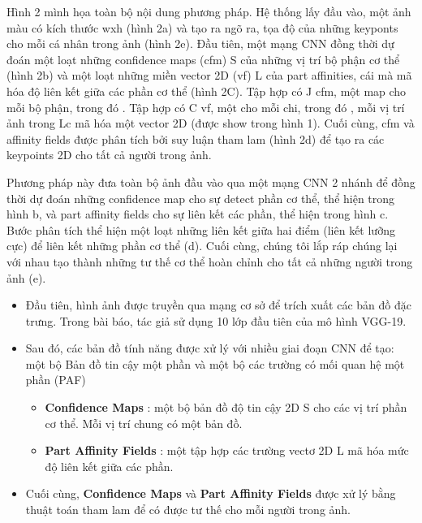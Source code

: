 Hình 2 mình họa toàn bộ nội dung phương pháp. Hệ thống lấy đầu vào, một ảnh màu có kích thước wxh (hình 2a) và tạo ra ngõ ra, tọa độ của những keyponts cho mỗi cá nhân trong ảnh (hình 2e). Đầu tiên, một mạng CNN đồng thời dự đoán một loạt những confidence maps (cfm) S của những vị trí bộ phận cơ thể (hình 2b) và một loạt những miền vector 2D (vf) L của part affinities, cái mà mã hóa độ liên kết giữa các phần cơ thể (hình 2C). Tập hợp  có J cfm, một map cho mỗi bộ phận, trong đó . Tập hợp  có C vf, một cho mỗi chi, trong đó , mỗi vị trí ảnh trong Lc mã hóa một vector 2D (được show trong hình 1). Cuối cùng, cfm và affinity fields được phân tích bởi suy luận tham lam (hình 2d) để tạo ra các keypoints 2D cho tất cả người trong ảnh.

Phương pháp này đưa toàn bộ ảnh đầu vào qua một mạng CNN 2 nhánh để đồng thời dự đoán những confidence map cho sự detect phần cơ thể, thể hiện trong hình b, và part affinity fields cho sự liên kết các phần, thể hiện trong hình c. Bước phân tích thể hiện một loạt những liên kết giữa hai điểm (liên kết lưỡng cực) để liên kết những phần cơ thể (d). Cuối cùng, chúng tôi lắp ráp chúng lại với nhau tạo thành những tư thế cơ thể hoàn chỉnh cho tất cả những người trong ảnh (e).

\begin{itemize} %
\item Đầu tiên, hình ảnh được truyền qua mạng cơ sở để trích xuất các bản đồ đặc trưng. Trong bài báo, tác giả sử dụng 10 lớp đầu tiên của mô hình VGG-19.
\end{itemize}


\begin{itemize} %
\item Sau đó, các bản đồ tính năng được xử lý với nhiều giai đoạn CNN để tạo: một bộ Bản đồ tin cậy một phần và một bộ các trường có mối quan hệ một phần (PAF)
	\begin{itemize}
	\item \textbf{Confidence Maps} : một bộ bản đồ độ tin cậy 2D S cho các vị trí phần cơ thể. Mỗi vị trí chung có một bản đồ.
	\item \textbf{Part Affinity Fields} : một tập hợp các trường vectơ 2D L mã hóa mức độ liên kết giữa các phần.
	\end{itemize}
\end{itemize}


\begin{itemize} %
\item Cuối cùng, \textbf{Confidence Maps} và \textbf{Part Affinity Fields} được xử lý bằng thuật toán tham lam để có được tư thế cho mỗi người trong ảnh.
\end{itemize}


